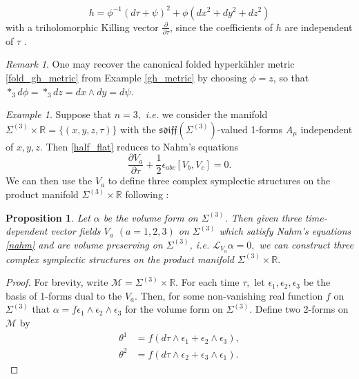 \documentclass[a4paper,onecolumn,12pt]{article}
\newtheorem{prop}[thm]{Proposition}
\theoremstyle{definition}
\theoremstyle{remark}
\newtheorem{rmk}[thm]{Remark}
\newtheorem{ex}[thm]{Example}
\newcommand{\ie}{\emph{i.e.} }
\newcommand{\e}{\epsilon}
\newcommand{\ddt}[1]{\frac{\partial #1}{\partial \tau}}
\newcommand{\dd}[2]{\frac{\partial #1}{\partial #2}}
\newcommand{\HK}{hyperk\"ahler }
\newcommand{\R}{\mathbb{R}}
\newcommand{\half}{\frac{1}{2}}
\begin{document}
\begin{equation}
	h = \phi^{-1}(d\tau + \psi)^{2} + \phi (dx^{2} + dy^{2} + dz^{2})
\end{equation}
with a triholomorphic Killing vector $\ddt{}$, since the coefficients of $h$ are independent of $\tau$ \cite{gibbons_1978}.
\\
\begin{rmk}
	One may recover the canonical folded \HK metric \ref{fold_gh_metric} from Example \ref{gh_metric} by choosing $\phi=z$, so that ${\ast}_{3} d\phi = {\ast}_{3}dz = dx\wedge dy=d\psi$.\\
\end{rmk}

\begin{ex}
	Suppose that $n=3,$ \ie we consider the manifold $\Sigma^{(3)}\times\R= \{(x,y,z,\tau)\}$ with the $\mathfrak{sdiff}(\Sigma^{(3)})$-valued 1-forms $A_{\mu}$ independent of $x,y,z$. Then \ref{half_flat} reduces to Nahm's equations
	\begin{equation}
	\label{nahm}
		\dd{V_{a}}{\tau} + \half\epsilon_{abc}[ V_{b},V_{c} ] = 0.
	\end{equation}
	We can then use the $V_{a}$ to define three complex symplectic structures on the product manifold $\Sigma^{(3)} \times\R$ following \cite{donaldson}:\\
	\begin{prop}
		Let $\alpha$ be the volume form on $\Sigma^{(3)}$. Then given three time-dependent vector fields $V_{a}$ $(a=1,2,3)$ on $\Sigma^{(3)}$ which satisfy Nahm's equations \ref{nahm} and are volume preserving on $\Sigma^{(3)}$, \ie $\mathcal{L}_{V_{a}}\alpha=0,$ we can construct three complex symplectic structures on the product manifold $\Sigma^{(3)} \times\R.$
	\end{prop}
	\begin{proof}
		For brevity, write $\mathcal{M} = \Sigma^{(3)}\times\R.$ For each time $\tau,$ let $\e_{1},\e_{2},\e_{3}$ be the basis of 1-forms dual to the $V_{a}.$ Then, for some non-vanishing real function $f$ on $\Sigma^{(3)}$ that $\alpha=f\e_{1}\wedge\e_{2}\wedge\e_{3}$
		for the volume form on $\Sigma^{(3)}.$ Define two 2-forms on $\mathcal{M}$ by
		\begin{subequations}
		\begin{align}
			\theta^{1} &= f(d\tau \wedge \e_{1} +  \e_{2}\wedge \e_{3}),\\
			\theta^{2} &= f(d\tau \wedge \e_{2} +  \e_{3}\wedge \e_{1}).
		\end{align}
		\end{subequations}

\end{proof}
\end{ex}
\end{document}
